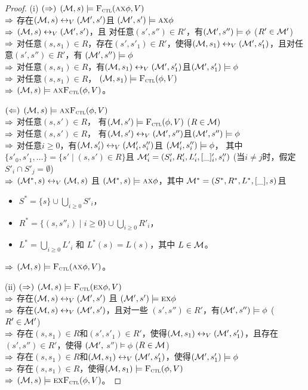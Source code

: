 \begin{proof}
	(i) $(\Rightarrow)$ $({\cal M},s)\models{\textsc{F}_{\textsc{ctl}}}(\textsc{a}\textsc{x}\phi,V)$\\
	$\Rightarrow$ 存在$({\cal M},s)\leftrightarrow_V({\cal M}',s')$且 $({\cal M}',s')\models \textsc{a}\textsc{x}\phi$\\
	$\Rightarrow$  $({\cal M},s)\leftrightarrow_V({\cal M}',s')$，且 对任意$(s',s'')\in R'$，有$({\cal M}',s'')\models \phi$ \hfill ($R'\in{\cal M}'$)\\
	$\Rightarrow$ 对任意$(s,s_1)\in R$，存在$(s',s'_1)\in R'$，使得$({\cal M},s_1)\leftrightarrow_V({\cal M}',s'_1)$，且对任意$(s',s'')\in R'$，有
	$({\cal M}',s'')\models \phi$\\
	$\Rightarrow$ 对任意$(s,s_1)\in R$，有$({\cal M},s_1)\leftrightarrow_V({\cal M}',s'_1)$且$({\cal M}',s'_1)\models\phi$\\
	$\Rightarrow$ 对任意$(s,s_1)\in R$， $({\cal M},s_1)\models{\textsc{F}_{\textsc{ctl}}}(\phi,V)$\\
	$\Rightarrow$ $({\cal M},s)\models\textsc{a}\textsc{x}{\textsc{F}_{\textsc{ctl}}}(\phi,V)$。
	
	$(\Leftarrow)$ $({\cal M},s)\models\textsc{a}\textsc{x}{\textsc{F}_{\textsc{ctl}}}(\phi,V)$\\
	$\Rightarrow$ 对任意$(s,s')\in R$， 有$({\cal M},s')\models{\textsc{F}_{\textsc{ctl}}}(\phi,V)$ \hfill ($R\in {\cal M})$\\
	$\Rightarrow$ 对任意$(s,s')\in R$， 有$({\cal M},s')\leftrightarrow_V({\cal M}',s'')$且$({\cal M}',s'')\models\phi$\\
	$\Rightarrow$ 对任意$i\ge 0$，有$({\cal M},s'_i)\leftrightarrow_V({\cal M}'_i,s''_i)$且 $({\cal M}'_i,s''_i)\models\phi$，
	其中 $\{s'_0,s'_1,\ldots\}=\{s'\mid (s,s')\in R\}$且 ${\cal M}'_i=(S'_i,R'_i,L'_i,[\_]'_i,s''_i)$ \hfill (当$i\neq j$时，假定$S'_i\cap S'_j=\emptyset$)\\
	$\Rightarrow$ $({\cal M}^*,s)\leftrightarrow_V({\cal M},s)$ 且 $({\cal M}^*,s)\models\textsc{a}\textsc{x}\phi$，其中
	${\cal M}^*=(S^*,R^*,L^*,[\_], s)$且
	\begin{itemize}
		\item $S^*=\{s\}\cup\bigcup_{i\ge 0}S'_i$，
		\item $R^*=\{(s,s''_i)\mid i\ge 0\}\cup \bigcup_{i\ge 0} R'_i$，
		\item $L^*=\bigcup_{i\ge 0}L'_i$ 和 $L^*(s)=L(s)$，其中 $L\in{\cal M}$。
	\end{itemize}
	$\Rightarrow$ $({\cal M},s)\models {\textsc{F}_{\textsc{ctl}}}(\textsc{a}\textsc{x}\phi,V)$。
	
	(ii) $(\Rightarrow)$ $({\cal M},s)\models{\textsc{F}_{\textsc{ctl}}}(\textsc{e}\textsc{x}\phi,V)$\\
	$\Rightarrow$ 存在$({\cal M},s)\leftrightarrow_V({\cal M}',s')$ 且 $({\cal M}',s')\models \textsc{e}\textsc{x}\phi$\\
	$\Rightarrow$ 存在$({\cal M},s)\leftrightarrow_V({\cal M}',s')$，且对一些 $(s',s'')\in R'$，有$({\cal M}',s'')\models \phi$ \hfill  ($R'\in{\cal M}'$)\\
	$\Rightarrow$ 存在$(s,s_1)\in R$和$(s',s'_1)\in R'$，使得$({\cal M},s_1)\leftrightarrow_V({\cal M}',s'_1)$，且存在$(s',s'')\in R'$，使得
	$({\cal M}',$ $s'')\models \phi$ \hfill ($R\in {\cal M}$)\\
	$\Rightarrow$ 存在$(s,s_1)\in R$和$({\cal M},s_1)\leftrightarrow_V({\cal M}',s'_1)$，使得$({\cal M}',s'_1)\models\phi$\\
	$\Rightarrow$ 存在$(s,s_1)\in R$，使得$({\cal M},s_1)\models{\textsc{F}_{\textsc{ctl}}}(\phi,V)$\\
	$\Rightarrow$ $({\cal M},s)\models\textsc{e}\textsc{x}{\textsc{F}_{\textsc{ctl}}}(\phi,V)$。
	

\end{proof}
